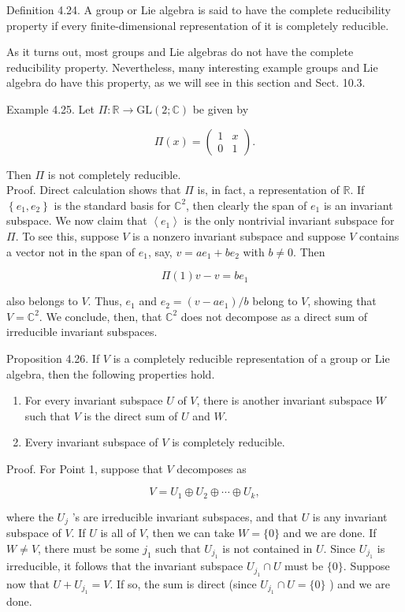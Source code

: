 \documentclass[10pt, letterpaper]{article}
\begin{document}
Definition 4.24. A group or Lie algebra is said to have the complete reducibility property if every finite-dimensional representation of it is completely reducible.

As it turns out, most groups and Lie algebras do not have the complete reducibility property. Nevertheless, many interesting example groups and Lie algebra do have this property, as we will see in this section and Sect. 10.3.

Example 4.25. Let $\Pi: \mathbb{R} \rightarrow \mathrm{GL}(2 ; \mathbb{C})$ be given by

$$
\Pi(x)=\left(\begin{array}{ll}
1 & x \\
0 & 1
\end{array}\right) .
$$

Then $\Pi$ is not completely reducible.\\
Proof. Direct calculation shows that $\Pi$ is, in fact, a representation of $\mathbb{R}$. If $\left\{e_{1}, e_{2}\right\}$ is the standard basis for $\mathbb{C}^{2}$, then clearly the span of $e_{1}$ is an invariant subspace. We now claim that $\left\langle e_{1}\right\rangle$ is the only nontrivial invariant subspace for $\Pi$. To see this, suppose $V$ is a nonzero invariant subspace and suppose $V$ contains a vector not in the span of $e_{1}$, say, $v=a e_{1}+b e_{2}$ with $b \neq 0$. Then

$$
\Pi(1) v-v=b e_{1}
$$

also belongs to $V$. Thus, $e_{1}$ and $e_{2}=\left(v-a e_{1}\right) / b$ belong to $V$, showing that $V=\mathbb{C}^{2}$. We conclude, then, that $\mathbb{C}^{2}$ does not decompose as a direct sum of irreducible invariant subspaces.

Proposition 4.26. If $V$ is a completely reducible representation of a group or Lie algebra, then the following properties hold.

\begin{enumerate}
  \item For every invariant subspace $U$ of $V$, there is another invariant subspace $W$ such that $V$ is the direct sum of $U$ and $W$.
  \item Every invariant subspace of $V$ is completely reducible.
\end{enumerate}

Proof. For Point 1, suppose that $V$ decomposes as

$$
V=U_{1} \oplus U_{2} \oplus \cdots \oplus U_{k},
$$

where the $U_{j}$ 's are irreducible invariant subspaces, and that $U$ is any invariant subspace of $V$. If $U$ is all of $V$, then we can take $W=\{0\}$ and we are done. If $W \neq V$, there must be some $j_{1}$ such that $U_{j_{1}}$ is not contained in $U$. Since $U_{j_{1}}$ is irreducible, it follows that the invariant subspace $U_{j_{1}} \cap U$ must be $\{0\}$. Suppose now that $U+U_{j_{1}}=V$. If so, the sum is direct (since $U_{j_{1}} \cap U=\{0\}$ ) and we are done.
\end{document}
